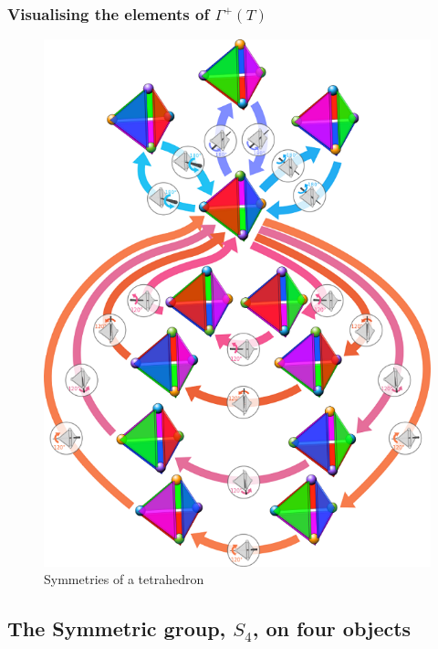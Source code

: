 \subsubsection{Visualising the elements of
$\Gamma^+(T)$}\label{visualising-the-elements-of-gammat}

\begin{figure}[htbp]
\centering
\includegraphics{./tetrahedrons.png}
\caption{Symmetries of a tetrahedron}
\end{figure}

\subsection{The Symmetric group, $S_4$, on four
objects}\label{the-symmetric-group-sux5f4-on-four-objects}

